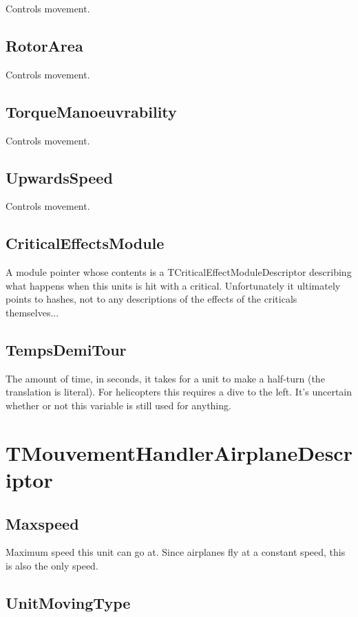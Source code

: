 \documentclass{article}
\begin{document}
Controls movement.

\subsection{RotorArea}

Controls movement.

\subsection{TorqueManoeuvrability}

Controls movement.

\subsection{UpwardsSpeed}

Controls movement.

\subsection{CriticalEffectsModule}

A module pointer whose contents is a TCriticalEffectModuleDescriptor describing what happens when this units is hit with a critical. Unfortunately it ultimately points to hashes, not to any descriptions of the effects of the criticals themselves...

\subsection{TempsDemiTour}

The amount of time, in seconds, it takes for a unit to make a half-turn (the translation is literal). For helicopters this requires a dive to the left. It's uncertain whether or not this variable is still used for anything.

\section{TMouvementHandlerAirplaneDescriptor}

\subsection{Maxspeed}

Maximum speed this unit can go at. Since airplanes fly at a constant speed, this is also the only speed.

\subsection{UnitMovingType}
\end{document}

